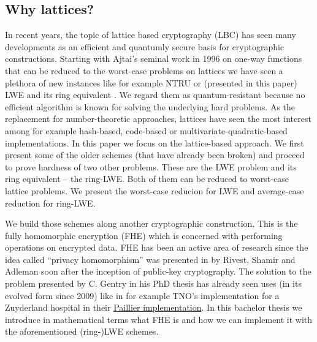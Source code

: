 \subsection{Why lattices?}
In recent years, the topic of lattice based cryptography (LBC) has seen many developments as an efficient and quantumly secure basis for cryptographic constructions. Starting with Ajtai's seminal work in 1996 \cite{ajtai} on one-way functions that can be reduced to the worst-case problems on lattices we have seen a plethora of new instances like for example NTRU \cite{ntru} or (presented in this paper) LWE \cite{regev} and its ring equivalent \cite{ring-lwe}. We regard them as quantum-resistant because no efficient algorithm is known for solving the underlying hard problems. As the replacement for number-theoretic approaches, lattices have seen the most interest among for example hash-based, code-based or multivariate-quadratic-based implementations. In this paper we focus on the lattice-based approach. We first present some of the older schemes (that have already been broken) and proceed to prove hardness of two other problems. These are the LWE problem and its ring equivalent -- the ring-LWE. Both of them can be reduced to worst-case lattice problems. We present the worst-case reducion for LWE and average-case reduction for ring-LWE.

We build those schemes along another cryptographic construction. This is the fully homomorphic encryption (FHE) which is concerned with performing operations on encrypted data. FHE has been an active area of research since the idea called ``privacy homomorphism'' was presented in \cite{primal} by Rivest, Shamir and Adleman soon after the inception of public-key cryptography. The solution to the problem presented by C. Gentry in his PhD thesis has already seen uses (in its evolved form since 2009) like in for example TNO's implementation for a Zuyderland hospital in their \href{https://eprint.iacr.org/2019/1136.pdf}{Paillier implementation}. In this bachelor thesis we introduce in mathematical terms what FHE is and how we can implement it with the aforementioned (ring-)LWE schemes.
\iffalse
\subsection{Motivation}
include the table from page 16 of \cite{bernstein} of systems broken by quantum computers\\
On the $18^{th}$ of November 2022, a \href{https://www.whitehouse.gov/wp-content/uploads/2022/11/M-23-02-M-Memo-on-Migrating-to-Post-Quantum-Cryptography.pdf}{document} was issued on migrating to post-quantum cryptography.
\fi

